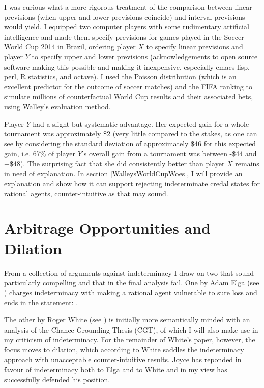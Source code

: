 \documentclass[11pt]{article}
\begin{document}
I was curious what a more rigorous treatment of the comparison between
linear previsions (when upper and lower previsions coincide) and
interval previsions would yield. I equipped two computer players with
some rudimentary artificial intelligence and made them specify
previsions for games played in the Soccer World Cup 2014 in Brazil,
ordering player $X$ to specify linear previsions and player $Y$ to
specify upper and lower previsions (acknowledgements to open source
software making this possible and making it inexpensive, especially
emacs lisp, perl, R statistics, and octave). I used the Poisson
distribution (which is an excellent predictor for the outcome of
soccer matches) and the FIFA ranking to simulate millions of
counterfactual World Cup results and their associated bets, using
Walley's evaluation method. 

Player $Y$ had a slight but systematic advantage. Her expected gain
for a whole tournament was approximately \$2 (very little compared to
the stakes, as one can see by considering the standard deviation of
approximately \$46 for this expected gain, i.e. 67\% of player $Y$'s
overall gain from a tournament was between -\$44 and +\$48). The
surprising fact that she did consistently better than player $X$
remains in need of explanation. In section \ref{WalleysWorldCupWoes},
I will provide an explanation and show how it can support rejecting
indeterminate credal states for rational agents, counter-intuitive as
that may sound.

\section{Arbitrage Opportunities and Dilation} 
\label{ArbitrageOpportunitiesAndDilation}

From a collection of arguments against indeterminacy I draw on two
that sound particularly compelling and that in the final analysis
fail. One by Adam Elga (see ) charges indeterminacy
with making a rational agent vulnerable to sure loss and ends in the
statement:  .

The other by Roger White (see ) is initially more
semantically minded with an analysis of the Chance Grounding Thesis
(CGT), of which I will also make use in my criticism of indeterminacy.
For the remainder of White's paper, however, the focus moves to
dilation, which according to White saddles the indeterminacy approach
with unacceptable counter-intuitive results. Joyce has reponded in
favour of indeterminacy both to Elga and to White and in my view has
successfully defended his position.
\end{document}
